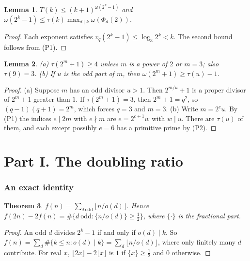 \documentclass[11pt]{amsart}
\newtheorem{theorem}{Theorem}[section]
\newtheorem{lemma}[theorem]{Lemma}
\theoremstyle{definition}
\theoremstyle{remark}
\begin{document}
\begin{lemma}\label{lem:Tupper}
$T(k)\le(k+1)^{\omega(2^k-1)}$ and $\omega(2^k-1)\le\tau(k)\max_{d\mid k}\omega(\Phi_d(2))$.
\end{lemma}
\begin{proof}
Each exponent satisfies $v_q(2^k-1)\le\log_3 2^k<k$. The second bound follows from (P1).
\end{proof}

\begin{lemma}\label{lem:plus}
(a) $\tau(2^m+1)\ge4$ unless $m$ is a power of $2$ or $m=3$; also $\tau(9)=3$.
(b) If $u$ is the odd part of $m$, then $\omega(2^m+1)\ge\tau(u)-1$.
\end{lemma}
\begin{proof}
(a) Suppose $m$ has an odd divisor $u>1$. Then $2^{m/u}+1$ is a proper divisor of $2^m+1$ greater than $1$.
If $\tau(2^m+1)=3$, then $2^m+1=q^2$, so $(q-1)(q+1)=2^m$, which forces $q=3$ and $m=3$.
(b) Write $m=2^cu$. By (P1) the indices $e\mid 2m$ with $e\nmid m$ are $e=2^{c+1}w$ with $w\mid u$. There are
$\tau(u)$ of them, and each except possibly $e=6$ has a primitive prime by (P2).
\end{proof}

\part*{Part I. The doubling ratio}

\section{An exact identity}

\begin{theorem}\label{thm:identity}
$f(n)=\sum_{d\ \mathrm{odd}}\lfloor n/o(d)\rfloor$. Hence
$f(2n)-2f(n)=\#\{d\ \mathrm{odd}:\{n/o(d)\}\ge\frac12\}$, where $\{\cdot\}$ is the fractional part.
\end{theorem}
\begin{proof}
An odd $d$ divides $2^k-1$ if and only if $o(d)\mid k$. So
$f(n)=\sum_{d}\#\{k\le n:o(d)\mid k\}=\sum_d\lfloor n/o(d)\rfloor$, where only finitely many $d$ contribute.
For real $x$, $\lfloor2x\rfloor-2\lfloor x\rfloor$ is $1$ if $\{x\}\ge\frac12$ and $0$ otherwise.
\end{proof}
\end{document}
